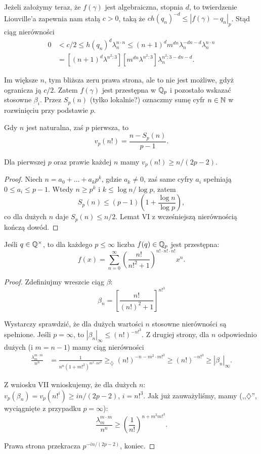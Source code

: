 Jeżeli założymy teraz, że $f(\gamma)$ jest algebraiczna, stopnia $d$, to twierdzenie Liouville'a zapewnia nam stałą $c > 0$, taką że $c h(q_n)^{-d} \le |f(\gamma) - q_n|_p$.
Stąd ciąg nierówności
\begin{align*}
	0 & < c/2 \le h(q_n)^d \lambda_n^{n \cdot n} \le (n+1)^d m^{dn} \lambda_n^{-dn-d} \lambda_n^{n \cdot n} \\
	& = [(n+1)^d \lambda^{n^2:3}] [m^{dn} \lambda^{n^2:3}] \lambda_n^{n^2:3-dn-d}.
\end{align*}

Im większe $n$, tym bliższa zeru prawa strona, ale to nie jest możliwe, gdyż ogranicza ją $c/2$.
Zatem $f(\gamma)$ jest przestępna w $\mathbb Q_p$ i pozostało wskazać stosowne $\beta_i$.
Przez $S_p(n)$  (tylko lokalnie?) oznaczmy sumę cyfr $n \in \mathbb N$ w rozwinięciu przy podstawie $p$.

\begin{lemat}[VI]
	Gdy $n$ jest naturalna, zaś $p$ pierwsza, to
	\[
		v_p(n!) = \frac{n-S_p(n)}{p-1}.
	\]
\end{lemat}

\begin{wniosek}[VII]
	Dla pierwszej $p$ oraz prawie każdej $n$ mamy $v_p(n!) \ge n/(2p-2)$.
\end{wniosek}

\begin{proof}
	Niech $n = a_0 + \ldots + a_k p^k$, gdzie $a_k \neq 0$, zaś same cyfry $a_i$ spełniają $0 \le a_i \le p-1$.
	Wtedy $n \ge p^k$ i $k \le \log n / \log p$, zatem
	\[
		S_p(n) \le (p-1) \left(1+ \frac{\log n}{\log p}\right),
	\]
	co dla dużych $n$ daje $S_p(n) \le n/2$.
	Lemat VI z wcześniejszą nierównością kończą dowód.
\end{proof}

\begin{fakt}
	Jeśli $q \in \mathbb Q^\times$, to dla każdego $p \le \infty$ liczba $f(q) \in \mathbb Q_p$ jest przestępna:
	\[
		f(x) = \sum_{n=0}^\infty \left(\frac{n!}{n!^2+1}\right)^{n! \cdot n! \cdot n!} x^n.
	\]
\end{fakt}

\begin{proof}
	Zdefiniujmy wreszcie ciąg $\beta$:
	\[
		\beta_n = \left[\frac{n!}{(n!)^2+1} \right]^{n!^3}
	\]

	Wystarczy sprawdzić, że dla dużych wartości $n$ stosowne nierówności są spełnione.
	Jeśli $p = \infty$, to $|\beta_n|_\infty \le (n!)^{-n!^3}$.
	Z drugiej strony, dla $n$ odpowiednio dużych (i $m = n-1$) mamy ciąg nierówności
	\begin{align*}
		\frac{\lambda_m^{m \cdot m}}{n^n} & = \frac{1}{n^n (1+m!^2)^{m^2 \cdot m!^3}}  \ge_\diamondsuit (n!)^{-n-m^2 \cdot m!^3}\ge (n!)^{-n!^3} \ge |\beta_n|_\infty.
	\end{align*}
	
	Z wniosku VII wnioskujemy, że dla dużych $n$: $v_p(\beta_n) = v_p(n!^i) \ge in / (2p-2)$, $i = n!^3$.
	Jak już zauważyliśmy, mamy (,,$\diamondsuit$'', wyciągnięte z przypadku $p = \infty$):
	\[
		\frac{\lambda_{m}^{m \cdot m}}{n^n} \ge \left(\frac{1}{n!}\right)^{n + m^2 m!^3}.
	\]
	
	Prawa strona przekracza $p^{-in/(2p-2)}$, koniec.
\end{proof}